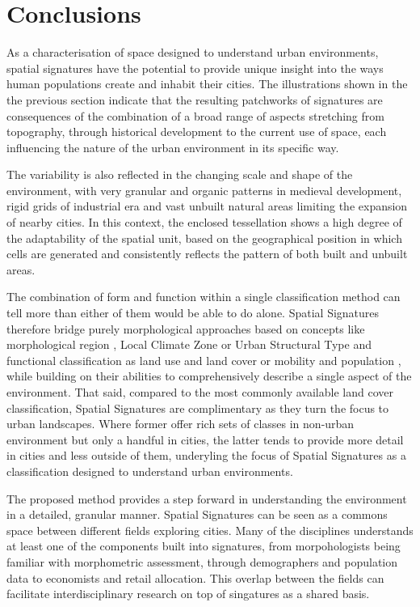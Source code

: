 \section{Conclusions}
\label{sec:conclusions}

As a characterisation of space designed to understand urban environments, spatial
signatures have the potential to provide unique insight into the ways human populations
create and inhabit their cities. The illustrations shown in the the previous section
indicate that the resulting patchworks of signatures are consequences of the combination
of a broad range of aspects stretching from topography, through historical development
to the current use of space, each influencing the nature of the urban environment in its
specific way.

The variability is also reflected in the changing scale and shape of the environment,
with very granular and organic patterns in medieval development, rigid grids of
industrial era and vast unbuilt natural areas limiting the expansion of nearby cities.
In this context, the enclosed tessellation shows a high degree of the adaptability of
the spatial unit, based on the geographical position in which cells are generated and
consistently reflects the pattern of both built and unbuilt areas.

The combination of form and function within a single classification method can tell more
than either of them would be able to do alone. Spatial Signatures therefore bridge
purely morphological approaches based on concepts like morphological region
\citep{oliveira2020}, Local Climate Zone \citep{stewart2012} or Urban Structural Type
\citep{lehner2019} and functional classification as land use and land cover
\citep{georganos2018very} or mobility and population \citep{gale2016creating}, while
building on their abilities to comprehensively describe a single aspect of the
environment. That said, compared to the most commonly available land cover
classification, Spatial Signatures are complimentary as they turn the focus to urban
landscapes. Where former offer rich sets of classes in non-urban environment but only a
handful in cities, the latter tends to provide more detail in cities and less outside of
them, underyling the focus of Spatial Signatures as a classification designed to
understand urban environments.

The proposed method provides a step forward in understanding the environment in a
detailed, granular manner. Spatial Signatures can be seen as a commons space between
different fields exploring cities. Many of the disciplines understands at least one of
the components built into signatures, from morpohologists being familiar with
morphometric assessment, through demographers and population data to economists and
retail allocation. This overlap between the fields can facilitate interdisciplinary
research on top of singatures as a shared basis.

